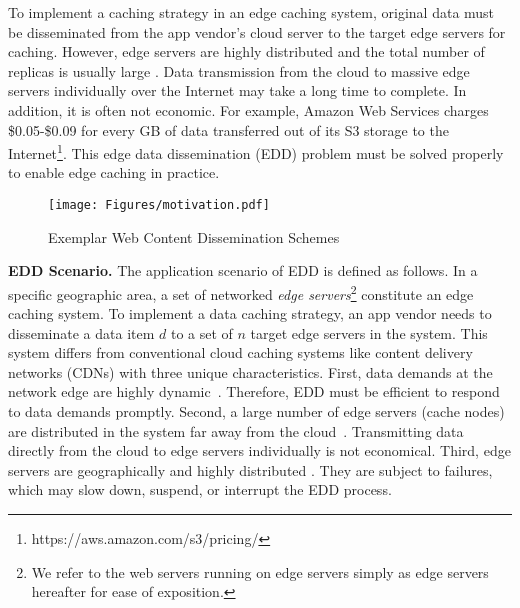 \documentclass[10pt,journal,compsoc]{IEEEtran}
\begin{document}
To implement a caching strategy in an edge caching system, original data must be disseminated from the app vendor's cloud server to the target edge servers for caching. However, edge servers are highly distributed and the total number of replicas is usually large \cite{he2019game}. Data transmission from the cloud to massive edge servers individually over the Internet may take a long time to complete. In addition, it is often not economic. For example, Amazon Web Services charges \$0.05-\$0.09 for every GB of data transferred out of its S3 storage to the Internet\footnote{https://aws.amazon.com/s3/pricing/}. This edge data dissemination (EDD) problem must be solved properly to enable edge caching in practice.

\begin{figure*}[tbp]
\centering
    \centering
    \texttt{[image: Figures/motivation.pdf]}
    \vspace{-1.5em}
    \caption{Exemplar Web Content Dissemination Schemes}    
    \vspace{-1.5em}
    \label{fig:motivation}
\end{figure*}

\smallskip
\textbf{EDD Scenario.} The application scenario of EDD is defined as follows. In a specific geographic area, a set of networked \textit{edge servers}\footnote{We refer to the web servers running on edge servers simply as edge servers hereafter for ease of exposition.} constitute an edge caching system. To implement a data caching strategy, an app vendor needs to disseminate a data item $d$ to a set of $n$ target edge servers in the system. This system differs from conventional cloud caching systems like content delivery networks (CDNs) with three unique characteristics. First, data demands at the network edge are highly dynamic~\cite{li2021Inspecting}. Therefore, EDD must be efficient to respond to data demands promptly. Second, a large number of edge servers (cache nodes) are distributed in the system far away from the cloud~\cite{li2021cooperative}. Transmitting data directly from the cloud to edge servers individually is not economical. Third, edge servers are geographically and highly distributed \cite{zhao2021joint}. They are subject to failures, which may slow down, suspend, or  interrupt the EDD process.
\end{document}
